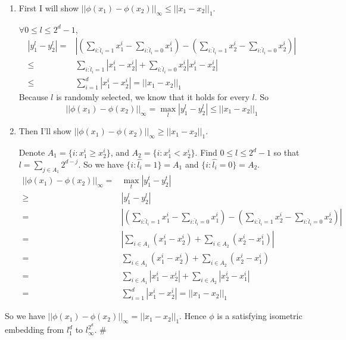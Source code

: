 \documentclass[twoside,11pt]{homework}
\begin{document}
\begin{enumerate}
    \item First I will show $||\phi(x_1)-\phi(x_2)||_\infty \leq ||x_1-x_2||_1$.
    
    $\forall 0 \leq l \leq 2^d-1$, 
    \begin{align*}
        |y_1^l-y_2^l| =& |(\sum_{i:\hat{l}_i=1}x_1^i - \sum_{i:\hat{l}_i=0}x_1^i) - (\sum_{i:\hat{l}_i=1}x_2^i - \sum_{i:\hat{l}_i=0}x_2^i)|\\
        \leq & \sum_{i:\hat{l}_i=1}|x_1^i-x_2^i| + \sum_{i:\hat{l}_i=0}x_2^i|x_1^i-x_2^i|\\
        \leq& \sum_{i=1}^d |x_1^i-x_2^i|
        =||x_1-x_2||_1
    \end{align*}
    Because $l$ is randomly selected, we know that it holds for every $l$. So
    $$||\phi(x_1)-\phi(x_2)||_\infty = \underset{l}{\max} |y_1^l-y_2^l| \leq ||x_1-x_2||_1$$
    
    
    \item Then I'll show $||\phi(x_1)-\phi(x_2)||_\infty  \geq ||x_1-x_2||_1$.
    
    Denote $A_1 = \{i: x_1^i \geq x_2^i\}$, and $A_2 = \{i: x_1^i < x_2^i\}$. Find $0 \leq l \leq 2^d - 1$ so that $l=\sum_{j \in A_1}2^{d-j}$. So we have $\{i: \hat{l_i}=1\} = A_1$ and $\{i: \hat{l_i}=0\} = A_2$. 
    \begin{align*}
        ||\phi(x_1)-\phi(x_2)||_\infty =& \underset{t}{\max} |y_1^t-y_2^t|\\
        \geq& |y_1^l-y_2^l|\\
        =& |(\sum_{i:\hat{l}_i=1}x_1^i - \sum_{i:\hat{l}_i=0}x_1^i) - (\sum_{i:\hat{l}_i=1}x_2^i - \sum_{i:\hat{l}_i=0}x_2^i)|\\
        =& |\sum_{i \in A_1} (x_1^i - x_2^i) + \sum_{i \in A_2}(x_2^i - x_1^i)|\\
        =&\sum_{i \in A_1} (x_1^i - x_2^i) + \sum_{i \in A_2}(x_2^i - x_1^i)\\
        =&\sum_{i \in A_1} |x_1^i - x_2^i| + \sum_{i \in A_2}|x_2^i - x_1^i|\\
        =&\sum_{i=1}^d |x_1^i - x_2^i|
        =||x_1-x_2||_1
    \end{align*}

    
\end{enumerate}
So we have $||\phi(x_1)-\phi(x_2)||_\infty = ||x_1-x_2||_1$. Hence $\phi$ is a satisfying isometric embedding from $l_1^d$ to $l_\infty^{2^d}$. \#
\end{document}
